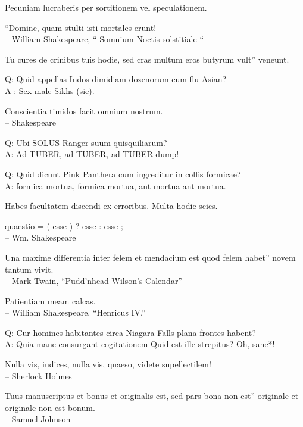 \documentclass[titlepage,12pt]{memoir}
\begin{document}
Pecuniam lucraberis per sortitionem vel speculationem.

“Domine, quam stulti isti mortales erunt!
\\-- William Shakespeare, “ Somnium Noctis solstitiale “

Tu cures de crinibus tuis hodie, sed cras multum eros butyrum vult”
veneunt.

Q: Quid appellas Indos dimidiam dozenorum cum flu Asian?\\
A : Sex male Sikhs (sic).

Conscientia timidos facit omnium nostrum.
\\-- Shakespeare

Q: Ubi SOLUS Ranger suum quisquiliarum?\\
A: Ad TUBER, ad TUBER, ad TUBER dump!

Q: Quid dicunt Pink Panthera cum ingreditur in collis formicae?\\
A: formica mortua, formica mortua, ant mortua ant mortua.

Habes facultatem discendi ex erroribus. Multa hodie scies.

 quaestio = ( esse ) ? esse : esse ;
\\-- Wm. Shakespeare

Una maxime differentia inter felem et mendacium est quod felem habet”
novem tantum vivit.
\\-- Mark Twain, “Pudd’nhead Wilson’s Calendar”

Patientiam meam calcas.
\\-- William Shakespeare, “Henricus IV.”

Q: Cur homines habitantes circa Niagara Falls plana frontes habent?\\
A: Quia mane consurgant cogitationem Quid est ille strepitus?
Oh, sane*!

Nulla vis, iudices, nulla vis, quaeso, videte supellectilem!
\\-- Sherlock Holmes

Tuus manuscriptus et bonus et originalis est, sed pars bona non est”
originale et originale non est bonum.
\\-- Samuel Johnson
\end{document}
